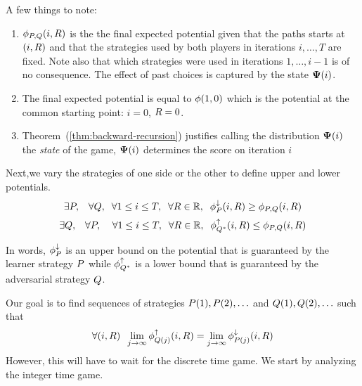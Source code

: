 \documentclass{article}[12pt]
\begin{document}
\renewcommand{\D}{{\cal D}}

\iffalse
\proof
Fixing $ \learnerM(i,\R), \adversM(i,\R)$ implies a fixed distribution
$\D$ over paths in $s \in [-1,+1]^T$. We denote the marginal of $\D$
over the iterations $i\leq j$ by $\D^{i,j}$

We can re-express each expected
value as:
\[
  \state(i)\odot \potPQ(i) = \E{s_1 \sim \D^{1,i}}{\E{s_2 \sim \D^{i+1,T}}{\pot(T,\R(s_1,s_2))}}
\]

\qed
\fi

A few things to note:
\begin{enumerate}
\item $\phi_{P,Q}(i,R)$ is the the final expected potential
  given that the paths starts at $(i,R)$ and that
  the strategies used by both players in iterations $i,\ldots,T$ are fixed. Note
  also that which strategies were used in iterations $1,\ldots,i-1$ is
  of no consequence. The effect of past choices is captured by the
  state ${\bf \Psi}(i)$.
\item
  The final expected potential is equal to $\phi(1,0)$ which is the
  potential at the common starting point: $i=0$, $R=0$.
\item
  Theorem~(\ref{thm:backward-recursion}) justifies calling the
  distribution ${\bf \Psi}(i)$ the {\em state} of the game, ${\bf \Psi}(i)$
  determines the score on iteration $i$
\end{enumerate}

Next,we vary the strategies of one side or the other to define upper
and lower potentials.
\begin{equation} \label{eqn:upperPotentials}
  \exists P, \;\;\; \forall Q,\;\; \forall 1\leq i \leq
  T,\;\; \forall R \in \mathbb{R},\;\; \phi_{P}^{\downarrow}(i,R) \geq \phi_{P,Q}(i,R)
\end{equation}
\begin{equation} \label{eqn:lowerPotentials}
  \exists Q, \;\;\; \forall P, \;\; \;\; \forall 1\leq i \leq
  T,\;\; \forall R \in \mathbb{R},\;\; \phi_{Q^*}^{\uparrow}(i,R) \leq \phi_{P,Q}(i,R)
\end{equation}

In words, $\phi_{P}^{\downarrow}$ is an upper bound on the potential that is 
guaranteed by the learner strategy $P$ while $\phi_{Q^*}^{\uparrow}$
is a lower bound that is guaranteed by the adversarial
strategy $Q$.

Our goal is to find sequences of strategies $P(1),P(2),\ldots$ and
$Q(1),Q(2),\ldots$ such that
\begin{equation} \label{eqn:limitPotential}
\forall (i,R)\;\;\lim_{j \to \infty}\phi_{Q(j)}^{\uparrow}(i,R) = \lim_{j \to
  \infty} \phi_{P(j)}^{\downarrow}(i,R)
\end{equation}
However, this will have to wait for the discrete time game.
We start by analyzing the integer time game. 
\end{document}
